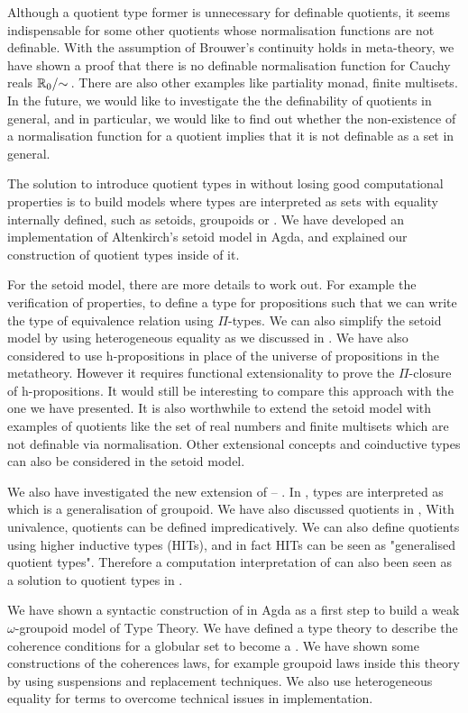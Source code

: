 Although a quotient type former is unnecessary for definable quotients, it seems indispensable for some other quotients whose normalisation functions are not definable. With the assumption of Brouwer's continuity holds in meta-theory, we have shown a proof that there is no definable normalisation function for Cauchy reals $\qset{\R_{0}}$. There are also other examples like partiality monad, finite multisets. 
In the future, we would like to investigate the the definability of quotients in general, and in particular, we would like to find out whether the non-existence of a normalisation function for a quotient implies that it is not definable as a set in general.


The solution to introduce quotient types in \itt without losing good computational properties is to build models where types are interpreted as sets with equality internally defined, such as setoids, groupoids or \wog. We have developed an implementation of Altenkirch's setoid model in Agda, and explained 
 our construction of quotient types inside of it.


For the setoid model, there are more details to work out. For example the verification of properties, to define a type for propositions such that we can write the type of equivalence relation using $\Pi$-types. We can also simplify the setoid model by using heterogeneous equality as we discussed in . We have also considered to use h-propositions in place of the universe of propositions in the metatheory. However it requires functional extensionality to prove the $\Pi$-closure of h-propositions. It would still be interesting to compare this approach with the one we have presented. It is also worthwhile to extend the setoid model with examples of quotients like the set of real numbers and finite multisets which are not definable via normalisation. 
Other extensional concepts and coinductive types can also be considered in the setoid model.


We also have investigated the new extension of \mltt --  \hott. In \hott, types are interpreted as \wog which is a generalisation of groupoid. We have also discussed quotients in \hott, With univalence, quotients can be defined impredicatively. We can also define quotients using higher inductive types (HITs), and in fact HITs can be seen as "generalised quotient types".
Therefore a computation interpretation of \hott can also been seen as a solution to quotient types in \itt. 

We have shown a syntactic construction of \wog in Agda as a first step to build a weak $\omega$-groupoid model of Type Theory. We have defined a type theory \tig to describe the coherence conditions for a globular set to become a \wogs. We have shown some constructions of the coherences laws, for example groupoid laws inside this theory by using suspensions and replacement techniques. We also use heterogeneous equality for terms to overcome technical issues in implementation.

